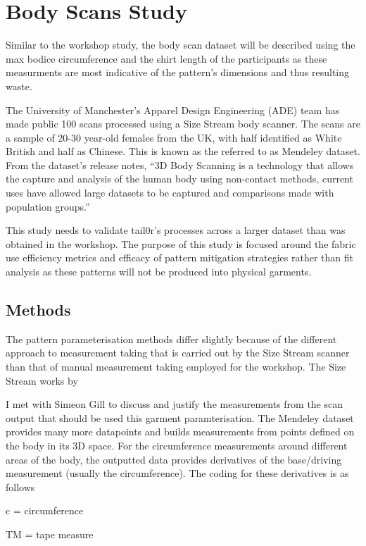 \section{Body Scans Study}
Similar to the workshop study, the body scan dataset will be described using the max bodice circumference and the shirt length of the participants as these measurments are most indicative of the pattern's dimensions and thus resulting waste.


The University of Manchester's Apparel Design Engineering (ADE) team has made public 100 scans processed using a Size Stream body scanner. The scans are a sample of 20-30 year-old females from the UK, with half identified as White British and half as Chinese. This is known as the referred to as Mendeley dataset. From the dataset's release notes, “3D Body Scanning is a technology that allows the capture and analysis of the human body using non-contact methods, current uses have allowed large datasets to be captured and comparisons made with population groups.”

This study needs to validate tail0r's processes across a larger dataset than was obtained in the workshop. The purpose of this study is focused around the fabric use efficiency metrics and efficacy of pattern mitigation strategies rather than fit analysis as these patterns will not be produced into physical garments.

\subsection{Methods}
The pattern parameterisation methods differ slightly because of the different approach to measurement taking that is carried out by the Size Stream scanner than that of manual measurement taking employed for the workshop. The Size Stream works by

I met with Simeon Gill to discuss and justify the measurements from the scan output that should be used this garment paramterisation. The Mendeley dataset provides many more datapoints and builds measurements from points defined on the body in its 3D space. For the circumference measurements around different areas of the body, the outputted data provides derivatives of the base/driving measurement (usually the circumference). The coding for these derivatives is as follows

c = circumference

TM = tape measure

